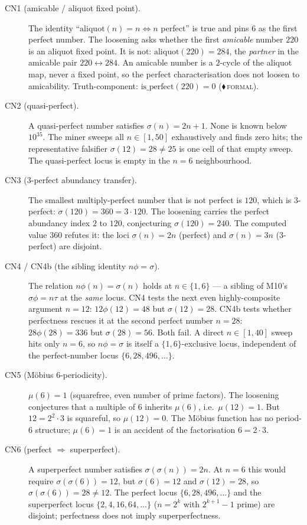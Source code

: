 \documentclass[11pt,a4paper]{article}
\newcommand{\sig}{\sigma}
\newcommand{\tierF}{\textcolor{blue!60!black}{$\blacklozenge$}\,\textsc{formal}}
\theoremstyle{definition}
\begin{document}
\begin{description}
\item[CN1 (amicable / aliquot fixed point).] The identity
  ``$\mathrm{aliquot}(n)=n\Leftrightarrow n$ perfect'' is true and pins $6$ as
  the first perfect number. The loosening asks whether the first \emph{amicable}
  number $220$ is an aliquot fixed point. It is not: $\mathrm{aliquot}(220)=284$,
  the \emph{partner} in the amicable pair $220\leftrightarrow284$. An amicable
  number is a $2$-cycle of the aliquot map, never a fixed point, so the perfect
  characterisation does not loosen to amicability. Truth-component:
  $\mathrm{is\_perfect}(220)=0$ (\tierF).
\item[CN2 (quasi-perfect).] A quasi-perfect number satisfies $\sig(n)=2n+1$.
  None is known below $10^{35}$. The miner sweeps all $n\in[1,50]$ exhaustively
  and finds zero hits; the representative falsifier $\sig(12)=28\neq25$ is one
  cell of that empty sweep. The quasi-perfect locus is empty in the $n=6$
  neighbourhood.
\item[CN3 ($3$-perfect abundancy transfer).] The smallest multiply-perfect
  number that is not perfect is $120$, which is $3$-perfect: $\sig(120)=360=3\cdot120$.
  The loosening carries the perfect abundancy index $2$ to $120$, conjecturing
  $\sig(120)=240$. The computed value $360$ refutes it: the loci $\sig(n)=2n$
  (perfect) and $\sig(n)=3n$ ($3$-perfect) are disjoint.
\item[CN4 / CN4b (the sibling identity $n\phi=\sig$).] The relation
  $n\phi(n)=\sig(n)$ holds at $n\in\{1,6\}$ --- a sibling of M10's
  $\sig\phi=n\tau$ at the \emph{same} locus. CN4 tests the next even
  highly-composite argument $n=12$: $12\phi(12)=48$ but $\sig(12)=28$. CN4b tests
  whether perfectness rescues it at the second perfect number $n=28$:
  $28\phi(28)=336$ but $\sig(28)=56$. Both fail. A direct $n\in[1,40]$ sweep
  hits only $n=6$, so $n\phi=\sig$ is itself a $\{1,6\}$-exclusive locus,
  independent of the perfect-number locus $\{6,28,496,\dots\}$.
\item[CN5 (M\"obius $6$-periodicity).] $\mu(6)=1$ (squarefree, even number of
  prime factors). The loosening conjectures that a multiple of $6$ inherits
  $\mu(6)$, i.e.\ $\mu(12)=1$. But $12=2^2\cdot3$ is squareful, so $\mu(12)=0$.
  The M\"obius function has no period-$6$ structure; $\mu(6)=1$ is an accident of
  the factorisation $6=2\cdot3$.
\item[CN6 (perfect $\Rightarrow$ superperfect).] A superperfect number satisfies
  $\sig(\sig(n))=2n$. At $n=6$ this would require $\sig(\sig(6))=12$, but
  $\sig(6)=12$ and $\sig(12)=28$, so $\sig(\sig(6))=28\neq12$. The perfect locus
  $\{6,28,496,\dots\}$ and the superperfect locus
  $\{2,4,16,64,\dots\}$ ($n=2^k$ with $2^{k+1}-1$ prime) are disjoint;
  perfectness does not imply superperfectness.
\end{description}
\end{document}
